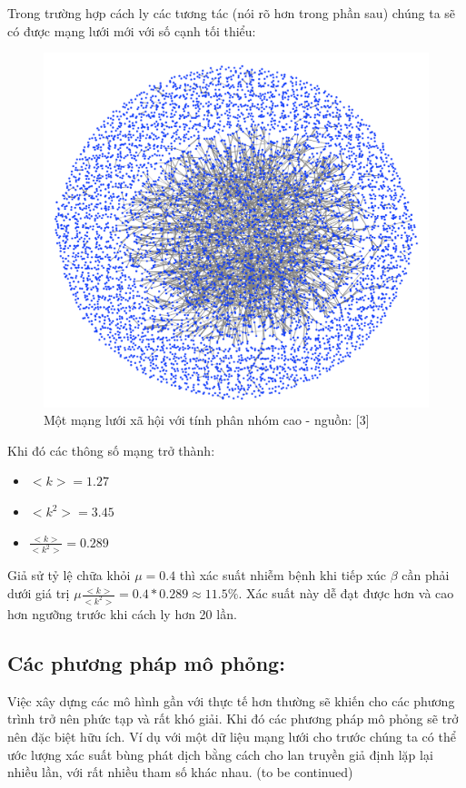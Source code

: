\documentclass[]{book}
\begin{document}
Trong trường hợp cách ly các tương tác (nói rõ hơn trong phần sau) chúng
ta sẽ có được mạng lưới mới với số cạnh tối thiểu:

\begin{figure}

{\centering \includegraphics[width=0.8\linewidth]{images/bitcoin_delete_edges} 

}

\caption{Một mạng lưới xã hội với tính phân nhóm cao - nguồn: [3]}\label{fig:network3}
\end{figure}

Khi đó các thông số mạng trở thành:

\begin{itemize}
\item
  \(<k> = 1.27\)
\item
  \(<k^2> = 3.45\)
\item
  \(\frac{<k>}{<k^2>} = 0.289\)
\end{itemize}

Giả sử tỷ lệ chữa khỏi \(\mu = 0.4\) thì xác suất nhiễm bệnh khi tiếp
xúc \(\beta\) cần phải dưới giá trị
\(\mu\frac{<k>}{<k^2>} = 0.4*0.289 \approx 11.5\%\). Xác suất này dễ đạt
được hơn và cao hơn ngưỡng trước khi cách ly hơn 20 lần.

\subsection{Các phương pháp mô phỏng:}\label{cac-phuong-phap-mo-phong}

Việc xây dựng các mô hình gần với thực tế hơn thường sẽ khiến cho các
phương trình trở nên phức tạp và rất khó giải. Khi đó các phương pháp mô
phỏng sẽ trở nên đặc biệt hữu ích. Ví dụ với một dữ liệu mạng lưới cho
trước chúng ta có thể ước lượng xác suất bùng phát dịch bằng cách cho
lan truyền giả định lặp lại nhiều lần, với rất nhiều tham số khác nhau.
(to be continued)
\end{document}
